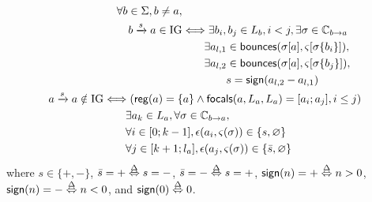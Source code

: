 \begin{definition}\label{def:inference-IG}
\begin{align}
\begin{split}
\forall b\in\Sigma, b\neq a, \\
b\xrightarrow s a \in \mathrm{IG} & \Longleftrightarrow
	\exists b_i,b_j\in L_b, i < j, \exists \sigma\in\mathbb C_{b\rightarrow a} \\
& \qquad
	\exists a_{l,1}\in\mathsf{bounces}(\sigma[a],\varsigma[\sigma\{b_i\}]), \\
& \qquad
	\exists a_{l,2}\in\mathsf{bounces}(\sigma[a],\varsigma[\sigma\{b_j\}]), \\
& \qquad\qquad
			s = \mathsf{sign}(a_{l,2} - a_{l,1})
\end{split}
\label{eq:IG-inference-b}
\\
\begin{split}
a \xrightarrow s a \notin\mathrm{IG} & \Longleftrightarrow
(\mathsf{reg}({a}) = \{a\} \wedge \mathsf{focals}(a, L_a, L_a) = [a_i;a_j], i\leq j) \\
& \qquad \exists a_k \in L_a, \forall \sigma\in\mathbb C_{b\rightarrow a}, \\
& \qquad \forall i \in [0;k-1], \epsilon(a_i, \varsigma(\sigma))\in \{s,\varnothing\} \\
& \qquad \forall j \in [k+1;l_a], \epsilon(a_j, \varsigma(\sigma))\in \{\bar s,\varnothing\}
\end{split}
\end{align}
where $s \in \{ +, - \}$, $\bar s = + \stackrel{\Delta}\Leftrightarrow s = -$, $\bar s = - \stackrel{\Delta}\Leftrightarrow s = +$,
$\mathsf{sign}(n) = + \stackrel{\Delta}\Leftrightarrow n > 0$,
$\mathsf{sign}(n) = - \stackrel{\Delta}\Leftrightarrow n < 0$,
and $\mathsf{sign}(0) \stackrel{\Delta}\Leftrightarrow 0$.
\end{definition}






